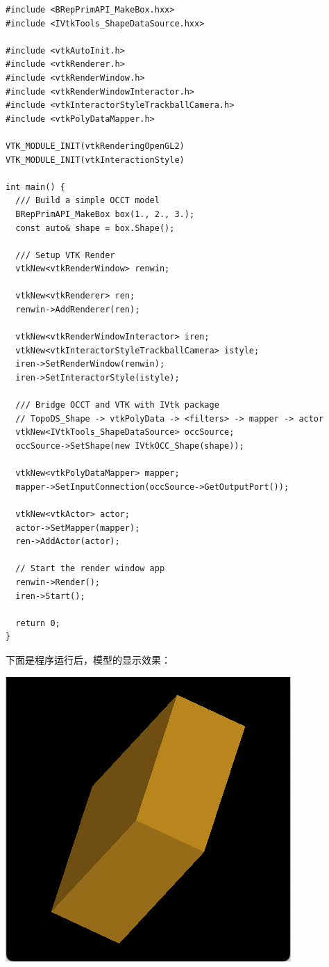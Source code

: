 \documentclass[11pt]{article}
\begin{document}
\begin{verbatim}
#include <BRepPrimAPI_MakeBox.hxx>
#include <IVtkTools_ShapeDataSource.hxx>

#include <vtkAutoInit.h>
#include <vtkRenderer.h>
#include <vtkRenderWindow.h>
#include <vtkRenderWindowInteractor.h>
#include <vtkInteractorStyleTrackballCamera.h>
#include <vtkPolyDataMapper.h>

VTK_MODULE_INIT(vtkRenderingOpenGL2)
VTK_MODULE_INIT(vtkInteractionStyle)

int main() {
  /// Build a simple OCCT model
  BRepPrimAPI_MakeBox box(1., 2., 3.);
  const auto& shape = box.Shape();

  /// Setup VTK Render
  vtkNew<vtkRenderWindow> renwin;

  vtkNew<vtkRenderer> ren;
  renwin->AddRenderer(ren);

  vtkNew<vtkRenderWindowInteractor> iren;
  vtkNew<vtkInteractorStyleTrackballCamera> istyle;
  iren->SetRenderWindow(renwin);
  iren->SetInteractorStyle(istyle);

  /// Bridge OCCT and VTK with IVtk package
  // TopoDS_Shape -> vtkPolyData -> <filters> -> mapper -> actor
  vtkNew<IVtkTools_ShapeDataSource> occSource;
  occSource->SetShape(new IVtkOCC_Shape(shape));

  vtkNew<vtkPolyDataMapper> mapper;
  mapper->SetInputConnection(occSource->GetOutputPort());

  vtkNew<vtkActor> actor;
  actor->SetMapper(mapper);
  ren->AddActor(actor);

  // Start the render window app
  renwin->Render();
  iren->Start();

  return 0;
}
\end{verbatim}

下面是程序运行后，模型的显示效果：

\begin{center}
\includegraphics[width=.9\linewidth]{./img/occt-vtk-viewer.png}
\end{center}
\end{document}
